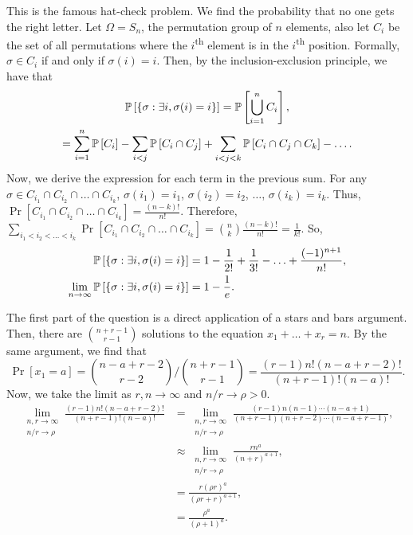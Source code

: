 \begin{solution}
    This is the famous hat-check problem. We find the probability that no one
    gets the right letter. Let $\Omega = S_n$, the permutation group of $n$
    elements, also let $C_i$ be the set of all permutations where the
    $i$\textsuperscript{th} element is in the $i$\textsuperscript{th} position.
    Formally, $\sigma \in C_i$ if and only if $\sigma(i) = i$. Then, by the
    inclusion-exclusion principle, we have that 
    \begin{gather*}
        \mathbb{P}\left[{\left\{ \sigma: \exists i, \sigma(i) = i \right\}}\right] = \mathbb{P}\left[{\bigcup_{i=1}^n C_i}\right], \\
        = \sum_{i=1}^n \mathbb{P}\left[{C_i}\right] - \sum_{i < j} \mathbb{P}\left[{C_i \cap C_j}\right] + \sum_{i < j < k} \mathbb{P}\left[{C_i \cap C_j \cap C_k}\right] - \ldots.
    \end{gather*}
    Now, we derive the expression for each term in the previous sum. For any
    $\sigma \in C_{i_1} \cap C_{i_2} \cap \ldots \cap C_{i_k}$, $\sigma(i_1) =
    i_1$, $\sigma(i_2) = i_2$, $\ldots$, $\sigma(i_k) = i_k$. Thus,
    $\Pr\left[{C_{i_1} \cap C_{i_2} \cap \ldots \cap C_{i_k}}\right] =
    \frac{(n-k)!}{n!}$. Therefore, $\sum_{i_1 < i_2 < \ldots < i_k}
    \Pr\left[{C_{i_1} \cap C_{i_2} \cap \ldots \cap C_{i_k}}\right] =
    \binom{n}{k}\frac{(n-k)!}{n!} = \frac{1}{k!}$. So,
    \begin{align*}
        \mathbb{P}\left[{\left\{ \sigma: \exists i, \sigma(i) = i \right\}}\right] &= 1 - \frac{1}{2!} + \frac{1}{3!} - \ldots + \frac{(-1)^{n+1}}{n!}, \\
        \lim_{n\to\infty} \mathbb{P}\left[{\left\{ \sigma: \exists i, \sigma(i) = i \right\}}\right] &= 1 - \frac{1}{e}.
    \end{align*}
\end{solution}
\begin{problem}{6}
\end{problem}
\begin{solution}
    The first part of the question is a direct application of a stars and bars
    argument. Then, there are $\binom{n+r-1}{r-1}$ solutions to the equation
    $x_1 + \ldots + x_r = n$. By the same argument, we find that 
    \[
        \Pr\left[{x_1 = a}\right] = \binom{n-a+r-2}{r-2} / \binom{n+r-1}{r-1} =  \frac{(r-1)n!(n-a+r-2)!}{(n+r-1)!(n-a)!}.
    \]
    Now, we take the limit as $r,n\to\infty$ and $n/r \to \rho > 0$. 
    \begin{align*}
        \lim_{\substack{n,r\to\infty\\ n/r\to\rho}}  \frac{(r-1)n!(n-a+r-2)!}{(n+r-1)!(n-a)!} &= \lim_{\substack{n,r\to\infty\\ n/r\to\rho}} \frac{(r-1)n(n-1)\cdots (n-a+1)}{(n+r-1)(n+r-2)\cdots (n-a+r-1)}, \\
        &\approx  \lim_{\substack{n,r\to\infty\\ n/r\to\rho}} \frac{rn^a}{(n+r)^{a+1}}, \\
        &= \frac{r(\rho r)^a}{(\rho r + r)^{a+1}}, \\
        &= \frac{\rho^a}{(\rho + 1)^a}.
    \end{align*}
\end{solution}

